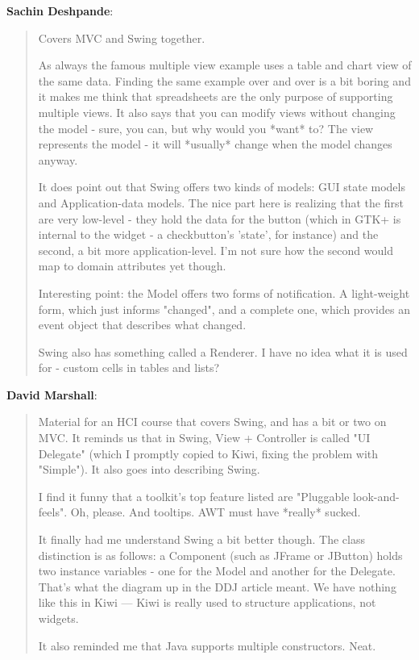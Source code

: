 \documentclass[a4paper]{howto}
\begin{document}
{\bf Sachin Deshpande}:

\begin{quotation}

    Covers MVC and Swing together.

    As always the famous multiple view example uses a table and chart
    view of the same data. Finding the same example over and over is a
    bit boring and it makes me think that spreadsheets are the only
    purpose of supporting multiple views.  It also says that you can
    modify views without changing the model - sure, you can, but why
    would you *want* to? The view represents the model - it will
    *usually* change when the model changes anyway.

    It does point out that Swing offers two kinds of models: GUI state
    models and Application-data models. The nice part here is realizing
    that the first are very low-level - they hold the data for the
    button (which in GTK+ is internal to the widget - a checkbutton's
    'state', for instance) and the second, a bit more application-level.
    I'm not sure how the second would map to domain attributes yet
    though.

    Interesting point: the Model offers two forms of notification. A
    light-weight form, which just informs "changed", and a complete one,
    which provides an event object that describes what changed.

    Swing also has something called a Renderer. I have no idea what it
    is used for - custom cells in tables and lists?

\end{quotation}

{\bf David Marshall}:

\begin{quotation}

    Material for an HCI course that covers Swing, and has a bit or two
    on MVC. It reminds us that in Swing, View + Controller is called "UI
    Delegate" (which I promptly copied to Kiwi, fixing the problem with
    "Simple"). It also goes into describing Swing.

    I find it funny that a toolkit's top feature listed are "Pluggable
    look-and-feels". Oh, please. And tooltips. AWT must have *really*
    sucked.

    It finally had me understand Swing a bit better though. The class
    distinction is as follows: a Component (such as JFrame or JButton)
    holds two instance variables - one for the Model and another for the
    Delegate. That's what the diagram up in the DDJ article meant. We
    have nothing like this in Kiwi --- Kiwi is really used to structure
    applications, not widgets.

    It also reminded me that Java supports multiple constructors. Neat.

\end{quotation}
\end{document}
